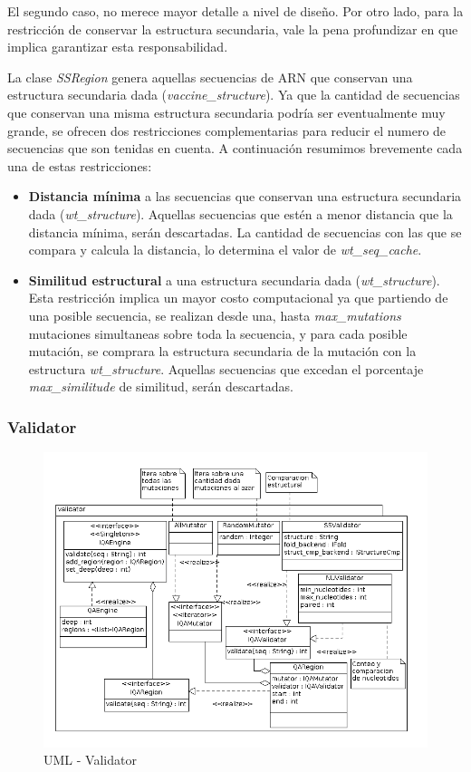   El segundo caso, no merece mayor detalle a nivel de dise\~no. Por otro lado,
para la restricci\'on de conservar la estructura secundaria, vale la pena
profundizar en que implica garantizar esta responsabilidad.

  La clase \textit{SSRegion} genera aquellas secuencias de ARN que conservan
una estructura secundaria dada (\textit{vaccine\_structure}). Ya que la cantidad
de secuencias que conservan una misma estructura secundaria podr\'ia ser
eventualmente muy grande, se ofrecen dos restricciones complementarias para
reducir el numero de secuencias que son tenidas en cuenta. A continuaci\'on
resumimos brevemente cada una de estas restricciones:

  \begin{itemize}
   \item \textbf{Distancia m\'inima} a las secuencias que conservan una
estructura secundaria dada (\textit{wt\_structure}). Aquellas secuencias que
est\'en a menor distancia que la distancia m\'inima, ser\'an descartadas. La
cantidad de secuencias con las que se compara y calcula la distancia, lo
determina el valor de \textit{wt\_seq\_cache}.
  
  \item \textbf{Similitud estructural} a una estructura secundaria dada
(\textit{wt\_structure}). Esta restricci\'on implica un mayor costo
computacional ya que partiendo de una posible secuencia, se realizan desde una,
hasta \textit{max\_mutations} mutaciones simultaneas sobre toda la secuencia, y
para cada posible mutaci\'on, se comprara la estructura secundaria de la
mutaci\'on con la estructura \textit{wt\_structure}. Aquellas secuencias que
excedan el porcentaje \textit{max\_similitude} de similitud, ser\'an
descartadas.
  \end{itemize}

  \subsubsection{Validator}
    \begin{figure}
      \centering
      \includegraphics[scale=0.5]{lld-validator.png}  
      \caption{UML - Validator}
      \label{uml:lld-validator}
    \end{figure}

